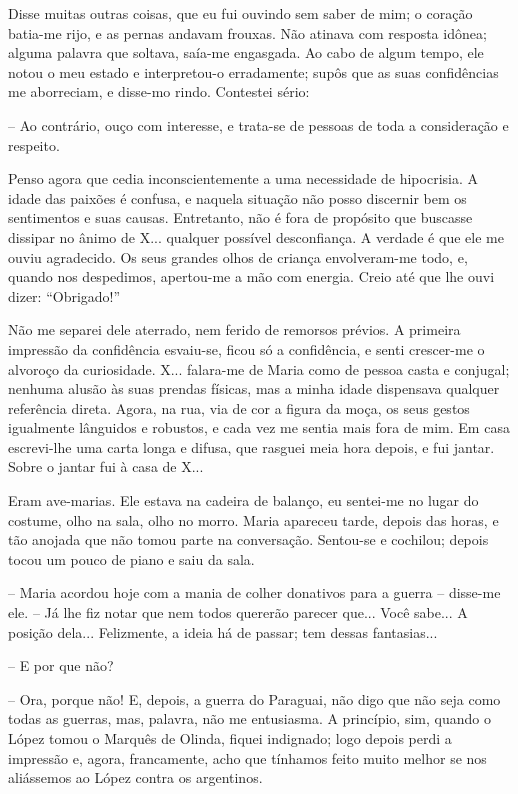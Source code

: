 Disse muitas outras coisas, que eu fui ouvindo sem saber de mim; o
coração batia-me rijo, e as pernas andavam frouxas. Não atinava com
resposta idônea; alguma palavra que soltava, saía-me engasgada. Ao cabo
de algum tempo, ele notou o meu estado e interpretou-o erradamente;
supôs que as suas confidências me aborreciam, e disse-mo rindo.
Contestei sério:

-- Ao contrário, ouço com interesse, e trata-se de pessoas de toda a
consideração e respeito.

Penso agora que cedia inconscientemente a uma necessidade de hipocrisia.
A idade das paixões é confusa, e naquela situação não posso discernir
bem os sentimentos e suas causas. Entretanto, não é fora de propósito
que buscasse dissipar no ânimo de X... qualquer possível desconfiança. A
verdade é que ele me ouviu agradecido. Os seus grandes olhos de criança
envolveram-me todo, e, quando nos despedimos, apertou-me a mão com
energia. Creio até que lhe ouvi dizer: ``Obrigado!''

Não me separei dele aterrado, nem ferido de remorsos prévios. A primeira
impressão da confidência esvaiu-se, ficou só a confidência, e senti
crescer-me o alvoroço da curiosidade. X... falara-me de Maria como de
pessoa casta e conjugal; nenhuma alusão às suas prendas físicas, mas a
minha idade dispensava qualquer referência direta. Agora, na rua, via de
cor a figura da moça, os seus gestos igualmente lânguidos e robustos, e
cada vez me sentia mais fora de mim. Em casa escrevi-lhe uma carta longa
e difusa, que rasguei meia hora depois, e fui jantar. Sobre o jantar fui
à casa de X...

Eram ave-marias. Ele estava na cadeira de balanço, eu sentei-me no lugar
do costume, olho na sala, olho no morro. Maria apareceu tarde, depois
das horas, e tão anojada que não tomou parte na conversação. Sentou-se e
cochilou; depois tocou um pouco de piano e saiu da sala.

-- Maria acordou hoje com a mania de colher donativos para a guerra --
disse-me ele. -- Já lhe fiz notar que nem todos quererão parecer que...
Você sabe... A posição dela... Felizmente, a ideia há de passar; tem
dessas fantasias...

-- E por que não?

-- Ora, porque não! E, depois, a guerra do Paraguai, não digo que não
seja como todas as guerras, mas, palavra, não me entusiasma. A
princípio, sim, quando o López tomou o Marquês de Olinda, fiquei
indignado; logo depois perdi a impressão e, agora, francamente, acho que
tínhamos feito muito melhor se nos aliássemos ao López contra os
argentinos.

